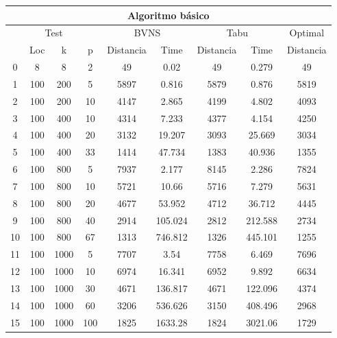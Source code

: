 \begin{center}
	\begin{adjustbox}{max width=\textwidth}
	\begin{tabular}{|c|c|c|c|c|c|c|c|c|} \hline
		\multicolumn{9}{|c|}{Algoritmo básico} \\ \hline
		\multicolumn{4}{|c|}{Test}& \multicolumn{2}{c}{BVNS} & \multicolumn{2}{|c|}{Tabu} & Optimal \\ \hline
		   & Loc & k    & p   & Distancia& Time     & Distancia& Time     & Distancia \\ \hline
		0  & 8   & 8    & 2   & 49       & 0.02     & 49       & 0.279    & 49        \\ \hline
		1  & 100 & 200  & 5   & 5897 	 & 0.816    & 5879     & 0.876    & 5819      \\ \hline
		2  & 100 & 200  & 10  & 4147 	 & 2.865    & 4199     & 4.802    & 4093      \\ \hline
		3  & 100 & 400  & 10  & 4314 	 & 7.233    & 4377     & 4.154    & 4250      \\ \hline
		4  & 100 & 400  & 20  & 3132 	 & 19.207   & 3093     & 25.669   & 3034      \\ \hline
		5  & 100 & 400  & 33  & 1414 	 & 47.734   & 1383     & 40.936   & 1355      \\ \hline
		6  & 100 & 800  & 5   & 7937 	 & 2.177    & 8145     & 2.286    & 7824      \\ \hline
		7  & 100 & 800  & 10  & 5721 	 & 10.66    & 5716     & 7.279    & 5631      \\ \hline
		8  & 100 & 800  & 20  & 4677 	 & 53.952   & 4712     & 36.712   & 4445      \\ \hline
		9  & 100 & 800  & 40  & 2914	 & 105.024  & 2812     & 212.588  & 2734      \\ \hline
		10 & 100 & 800  & 67  & 1313	 & 746.812  & 1326     & 445.101  & 1255      \\ \hline
		11 & 100 & 1000 & 5   & 7707	 & 3.54     & 7758     & 6.469    & 7696      \\ \hline
		12 & 100 & 1000 & 10  & 6974	 & 16.341   & 6952     & 9.892    & 6634      \\ \hline
		13 & 100 & 1000 & 30  & 4671	 & 136.817  & 4671     & 122.096  & 4374      \\ \hline
		14 & 100 & 1000 & 60  & 3206	 & 536.626  & 3150     & 408.496  & 2968      \\ \hline
		15 & 100 & 1000 & 100 & 1825	 & 1633.28  & 1824     & 3021.06  & 1729      \\ \hline

\end{tabular}
\end{adjustbox}
\end{center}
